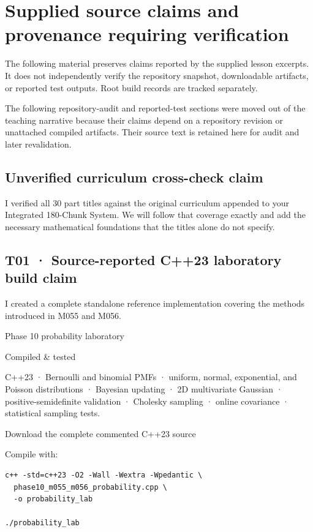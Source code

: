\section{Supplied source claims and provenance requiring verification}\label{02-foundations-ii-ch039-supplied-source-claims-and-provenance-requiring-verification}

The following material preserves claims reported by the supplied lesson excerpts. It does not independently verify the repository snapshot, downloadable artifacts, or reported test outputs. Root build records are tracked separately.

The following repository-audit and reported-test sections were moved out of the teaching narrative because their claims depend on a repository revision or unattached compiled artifacts. Their source text is retained here for audit and later revalidation.

\subsection{Unverified curriculum cross-check claim}\label{02-foundations-ii-ch039-unverified-curriculum-cross-check-claim}

I verified all 30 part titles against the original curriculum appended to your Integrated 180-Chunk System. We will follow that coverage exactly and add the necessary mathematical foundations that the titles alone do not specify.

\subsection{T01 · Source-reported C++23 laboratory build claim}\label{02-foundations-ii-ch039-t01-source-reported-c23-laboratory-build-claim}

I created a complete standalone reference implementation covering the methods introduced in M055 and M056.

Phase 10 probability laboratory

Compiled \& tested

C++23 · Bernoulli and binomial PMFs · uniform, normal, exponential, and Poisson distributions · Bayesian updating · 2D multivariate Gaussian · positive-semidefinite validation · Cholesky sampling · online covariance · statistical sampling tests.

Download the complete commented C++23 source

Compile with:

\begin{verbatim}
c++ -std=c++23 -O2 -Wall -Wextra -Wpedantic \
  phase10_m055_m056_probability.cpp \
  -o probability_lab

./probability_lab
\end{verbatim}

